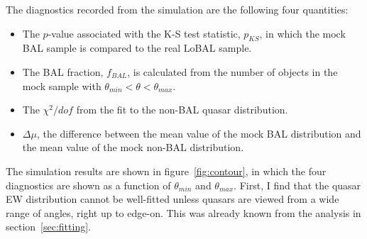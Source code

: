 The diagnostics recorded from the simulation are the following four
quantities:
\begin{itemize}
	\item The $p$-value associated with the K-S test statistic, $p_{KS}$, 
	in which the mock BAL sample is compared to the real LoBAL sample.
	\item The BAL fraction, $f_{BAL}$, is calculated from the 
	number of objects in the mock sample with $\theta_{min}<\theta<\theta_{max}$.
	\item The $\chi^2/dof$ from the fit to the non-BAL quasar distribution.
	\item $\Delta \mu$, the difference between the mean value of the mock BAL
	distribution and the mean value of the mock non-BAL distribution.
\end{itemize}
The simulation results are shown in figure~\ref{fig:contour}, in which the 
four diagnostics are shown as a function of $\theta_{min}$ 
and $\theta_{max}$. First, I find that the quasar EW distribution
cannot be well-fitted unless quasars are viewed from a wide range of angles,
right up to edge-on. This was already known from the analysis in 
section~\ref{sec:fitting}.



